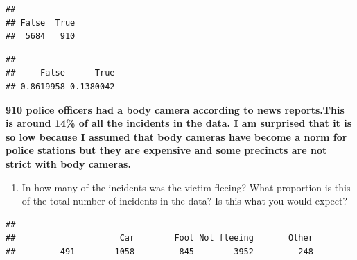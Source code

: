 \documentclass[
]{article}
\newenvironment{Shaded}{\begin{snugshade}}{\end{snugshade}}
\newcommand{\FunctionTok}[1]{\textcolor[rgb]{0.00,0.00,0.00}{#1}}
\newcommand{\NormalTok}[1]{#1}
\newcommand{\SpecialCharTok}[1]{\textcolor[rgb]{0.00,0.00,0.00}{#1}}
\providecommand{\tightlist}{%
  \setlength{\itemsep}{0pt}\setlength{\parskip}{0pt}}
\begin{document}
\begin{Shaded}
\end{Shaded}

\begin{verbatim}
## 
## False  True 
##  5684   910
\end{verbatim}

\begin{Shaded}
\end{Shaded}

\begin{verbatim}
## 
##     False      True 
## 0.8619958 0.1380042
\end{verbatim}

\textbf{910 police officers had a body camera according to news
reports.This is around 14\% of all the incidents in the data. I am
surprised that it is so low because I assumed that body cameras have
become a norm for police stations but they are expensive and some
precincts are not strict with body cameras.}

\begin{enumerate}
\def\labelenumi{\alph{enumi}.}
\setcounter{enumi}{1}
\tightlist
\item
  In how many of the incidents was the victim fleeing? What proportion
  is this of the total number of incidents in the data? Is this what you
  would expect?
\end{enumerate}

\begin{Shaded}
\end{Shaded}

\begin{verbatim}
## 
##                     Car        Foot Not fleeing       Other 
##         491        1058         845        3952         248
\end{verbatim}

\begin{Shaded}
\end{Shaded}
\end{document}
